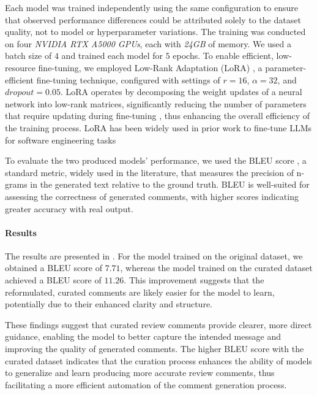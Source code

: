Each model was trained independently using the same configuration to ensure that observed performance differences could be attributed solely to the dataset quality, not to model or hyperparameter variations. The training was conducted on four \emph{NVIDIA RTX A5000 GPUs}, each with \emph{24GB} of memory. We used a batch size of $4$ and trained each model for $5$ epochs. To enable efficient, low-resource fine-tuning, we employed Low-Rank Adaptation (LoRA) \cite{hu2021lora}, a parameter-efficient fine-tuning technique, configured with settings of $r = 16$, $\alpha = 32$, and $dropout = 0.05$. LoRA operates by decomposing the weight updates of a neural network into low-rank matrices, significantly reducing the number of parameters that require updating during fine-tuning \cite{hu2021lora}, thus enhancing the overall efficiency of the training process.
LoRA has been widely used in prior work to fine-tune LLMs for software engineering tasks~\cite{lu2023llama, weyssow2023exploring, hou2023large, silva2023repairllama}


To evaluate the two produced models’ performance, we used the BLEU score \cite{papineni2002bleu}, a standard metric, widely used in the literature, that measures the precision of n-grams in the generated text relative to the ground truth. BLEU is well-suited for assessing the correctness of generated comments, with higher scores indicating greater accuracy with real output.


\paragraph{\textbf{Results}}
The results are presented in . For the model trained on the original dataset, we obtained a BLEU score of $7.71$, whereas the model trained on the curated dataset achieved a BLEU score of $11.26$. This improvement suggests that the reformulated, curated comments are likely easier for the model to learn, potentially due to their enhanced clarity and structure.

These findings suggest that curated review comments provide clearer, more direct guidance, enabling the model to better capture the intended message and improving the quality of generated comments. The higher BLEU score with the curated dataset indicates that the curation process enhances the ability of models to generalize and learn producing more accurate review comments, thus facilitating a more efficient automation of the comment generation process.

